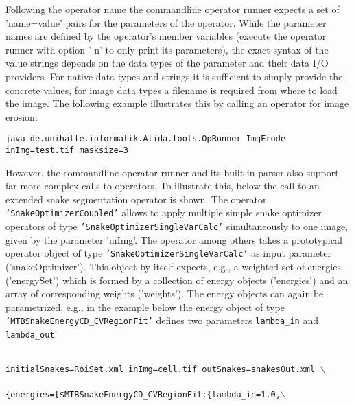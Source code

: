 Following the operator name the commandline operator runner expects a set of 'name=value' pairs 
for the parameters of the operator. While the parameter names are defined by the operator's 
member variables (execute the operator runner with option '-n' to only print its parameters), 
the exact 
syntax of the value strings depends on the data types of the parameter and their data I/O providers. 
For native data types and 
strings it is sufficient to simply provide the concrete values, for image data types a filename
is required from where to load the image. The following example illustrates this by calling 
an operator for image erosion:
{\small
\begin{center}
{\tt java de.unihalle.informatik.Alida.tools.OpRunner ImgErode inImg=test.tif
masksize=3}
\end{center}
}
However, the commandline operator runner and its built-in parser also support far more complex 
calls to operators. To illustrate this, below the call to an extended snake segmentation operator
is shown. The operator {\tt 'SnakeOptimizerCoupled'} allows to apply multiple simple snake 
optimizer operators of type 
{\tt 'SnakeOptimizerSingleVarCalc'} simultaneously to one image, given by the parameter 'inImg'. 
The operator among others takes a prototypical operator object 
of type {\tt 'SnakeOptimizerSingleVarCalc'} as input parameter ('snakeOptimizer'). This object 
by itself expects, e.g., a weighted set of energies ('energySet') which is formed by a collection 
of energy objects ('energies') and an array of corresponding weights ('weights'). The energy
objects can again be parametrized, e.g., in the example below the energy object of type 
{\tt 'MTBSnakeEnergyCD\_CVRegionFit'} defines two parameters {\tt lambda\_in} and {\tt lambda\_out}:
\begin{center}
\hspace*{-1cm}{\tt java  de.unihalle.informatik.Alida.tools.OpRunner 
SnakeOptimizerCoupled $\backslash$ }\\
{\tt  initialSnakes=RoiSet.xml inImg=cell.tif outSnakes=snakesOut.xml $\backslash$}\\
\\
{\tt \{energies=[\$MTBSnakeEnergyCD\_CVRegionFit:\{lambda\_in=1.0,$\backslash$}\\
\hspace*{9cm}{\tt lambda\_out=5.0\}],$\backslash$}\\
\end{center}

